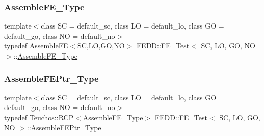\subsubsection{\texorpdfstring{Assemble\+F\+E\+\_\+\+Type}{AssembleFE\_Type}}
{\footnotesize\ttfamily template$<$class SC  = default\+\_\+sc, class LO  = default\+\_\+lo, class GO  = default\+\_\+go, class NO  = default\+\_\+no$>$ \\
typedef \hyperlink{classFEDD_1_1AssembleFE}{Assemble\+FE}$<$\hyperlink{fe__test__laplace_8cpp_a79c7e86a57edbb2a5a53242bcd04e41e}{SC},\hyperlink{fe__test__laplace_8cpp_ad6a38c9f07d3fd633eefca5bccad8410}{LO},\hyperlink{fe__test__laplace_8cpp_afa2946b509009b4f45eb04bd8c5b27d9}{GO},\hyperlink{fe__test__laplace_8cpp_a5e24f37b28787429872b6ecb1d0417ce}{NO}$>$ \hyperlink{classFEDD_1_1FE__Test}{F\+E\+D\+D\+::\+F\+E\+\_\+\+Test}$<$ \hyperlink{fe__test__laplace_8cpp_a79c7e86a57edbb2a5a53242bcd04e41e}{SC}, \hyperlink{fe__test__laplace_8cpp_ad6a38c9f07d3fd633eefca5bccad8410}{LO}, \hyperlink{fe__test__laplace_8cpp_afa2946b509009b4f45eb04bd8c5b27d9}{GO}, \hyperlink{fe__test__laplace_8cpp_a5e24f37b28787429872b6ecb1d0417ce}{NO} $>$\+::\hyperlink{classFEDD_1_1FE__Test_afbc20c921480ce9f89ec045f94f6806a}{Assemble\+F\+E\+\_\+\+Type}}

\mbox{\label{classFEDD_1_1FE__Test_a7a938cd88b5f936c58993fff97074e2d}} 
\subsubsection{\texorpdfstring{Assemble\+F\+E\+Ptr\+\_\+\+Type}{AssembleFEPtr\_Type}}
{\footnotesize\ttfamily template$<$class SC  = default\+\_\+sc, class LO  = default\+\_\+lo, class GO  = default\+\_\+go, class NO  = default\+\_\+no$>$ \\
typedef Teuchos\+::\+R\+CP$<$\hyperlink{classFEDD_1_1FE__Test_afbc20c921480ce9f89ec045f94f6806a}{Assemble\+F\+E\+\_\+\+Type}$>$ \hyperlink{classFEDD_1_1FE__Test}{F\+E\+D\+D\+::\+F\+E\+\_\+\+Test}$<$ \hyperlink{fe__test__laplace_8cpp_a79c7e86a57edbb2a5a53242bcd04e41e}{SC}, \hyperlink{fe__test__laplace_8cpp_ad6a38c9f07d3fd633eefca5bccad8410}{LO}, \hyperlink{fe__test__laplace_8cpp_afa2946b509009b4f45eb04bd8c5b27d9}{GO}, \hyperlink{fe__test__laplace_8cpp_a5e24f37b28787429872b6ecb1d0417ce}{NO} $>$\+::\hyperlink{classFEDD_1_1FE__Test_a7a938cd88b5f936c58993fff97074e2d}{Assemble\+F\+E\+Ptr\+\_\+\+Type}}

